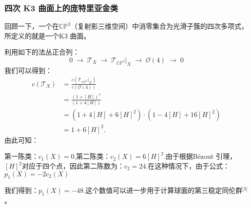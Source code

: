 \subsubsection{四次 K3 曲面上的庞特里亚金类}
回顾一下，一个在$\mathbb{CP}^3$（复射影三维空间）中消零集合为光滑子簇的四次多项式，所定义的就是一个K3 曲面。

利用如下的法丛正合列：
$$
0 \;\longrightarrow\; \mathcal{T}_X
\;\longrightarrow\; \mathcal{T}_{\mathbb{CP}^3}|_X
\;\longrightarrow\; \mathcal{O}(4)
\;\longrightarrow\; 0~
$$
我们可以得到：
$$
\begin{aligned}
c(\mathcal{T}_X)
&= \frac{c(\mathcal{T}_{\mathbb{CP}^3}|_X)}{c(\mathcal{O}(4))} \\[6pt]
&= \frac{(1 + [H])^4}{(1 + 4[H])} \\[6pt]
&= (1 + 4[H] + 6[H]^2) \cdot (1 - 4[H] + 16[H]^2) \\[6pt]
&= 1 + 6[H]^2.
\end{aligned}~
$$
由此可知：

第一陈类：$c_1(X) = 0$,第二陈类：$c_2(X) = 6[H]^2$.由于根据Bézout 引理，$[H]^2$对应于四个点，因此第二陈数为：$c_2 = 24$.在这种情况下，由于公式：$p_1(X) = -2c_2(X)$

我们得到：$p_1(X) = -48$.这个数值可以进一步用于计算球面的第三稳定同伦群\(^\text{[3]}\)。
